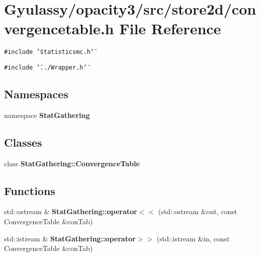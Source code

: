 \section{Gyulassy/opacity3/src/store2d/convergencetable.h File Reference}
\label{convergencetable_8h}
{\tt \#include \char`\"{}statisticsmc.h\char`\"{}}\par
{\tt \#include \char`\"{}../Wrapper.h\char`\"{}}\par
\subsection*{Namespaces}
\begin{CompactItemize}
\item 
namespace {\bf StatGathering}
\end{CompactItemize}
\subsection*{Classes}
\begin{CompactItemize}
\item 
class {\bf StatGathering::ConvergenceTable}
\end{CompactItemize}
\subsection*{Functions}
\begin{CompactItemize}
\item 
std::ostream \& {\bf StatGathering::operator$<$$<$} (std::ostream \&out, const ConvergenceTable \&conTab)
\item 
std::istream \& {\bf StatGathering::operator$>$$>$} (std::istream \&in, const ConvergenceTable \&conTab)
\end{CompactItemize}
